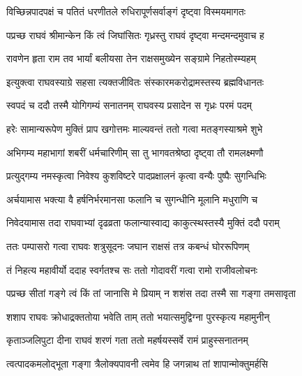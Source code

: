 \twolineshloka
{विच्छिन्नपादपक्षं च पतितं धरणीतले}
{रुधिरापूर्णसर्वाङ्गं दृष्ट्वा विस्मयमागतः}%

\twolineshloka
{पप्रच्छ राघवं श्रीमान्केन किं त्वं जिघांसितः}
{गृध्रस्तु राघवं दृष्ट्वा मन्दमन्दमुवाच ह}%


\twolineshloka
{रावणेन हृता राम तव भार्यां बलीयसा}
{तेन राक्षसमुख्येन सङ्ग्रामे निहतोस्म्यहम्}%


\twolineshloka
{इत्युक्त्वा राघवस्याग्रे सहसा त्यक्तजीवितः}
{संस्कारमकरोद्रामस्तस्य ब्रह्मविधानतः}%

\twolineshloka
{स्वपदं च ददौ तस्मै योगिगम्यं सनातनम्}
{राघवस्य प्रसादेन स गृध्रः परमं पदम्}%

\twolineshloka
{हरेः सामान्यरूपेण मुक्तिं प्राप खगोत्तमः}
{माल्यवन्तं ततो गत्वा मतङ्गस्याश्रमे शुभे}%

\twolineshloka
{अभिगम्य महाभागां शबरीं धर्मचारिणीम्}
{सा तु भागवतश्रेष्ठा दृष्ट्वा तौ रामलक्ष्मणौ}%

\twolineshloka
{प्रत्युद्गम्य नमस्कृत्वा निवेश्य कुशविष्टरे}
{पादप्रक्षालनं कृत्वा वन्यैः पुष्पैः सुगन्धिभिः}%

\twolineshloka
{अर्चयामास भक्त्या वै हर्षनिर्भरमानसा}
{फलानि च सुगन्धीनि मूलानि मधुराणि च}%

\twolineshloka
{निवेदयामास तदा राघवाभ्यां दृढव्रता}
{फलान्यास्वाद्य काकुत्स्थस्तस्यै मुक्तिं ददौ पराम्}%

\twolineshloka
{ततः पम्पासरो गत्वा राघवः शत्रुसूदनः}
{जघान राक्षसं तत्र कबन्धं घोररूपिणम्}%

\twolineshloka
{तं निहत्य महावीर्यो ददाह स्वर्गतश्च सः}
{ततो गोदावरीं गत्वा रामो राजीवलोचनः}%

\twolineshloka
{पप्रच्छ सीतां गङ्गे त्वं किं तां जानासि मे प्रियाम्}
{न शशंस तदा तस्मै सा गङ्गा तमसावृता}%

\twolineshloka
{शशाप राघवः क्रोधाद्रक्ततोया भवेति ताम्}
{ततो भयात्समुद्विग्ना पुरस्कृत्य महामुनीन्}%

\twolineshloka
{कृताञ्जलिपुटा दीना राघवं शरणं गता}
{ततो महर्षयस्सर्वे रामं प्राहुस्सनातनम्}%


\twolineshloka
{त्वत्पादकमलोद्भूता गङ्गा त्रैलोक्यपावनी}
{त्वमेव हि जगन्नाथ तां शापान्मोक्तुमर्हसि}%



